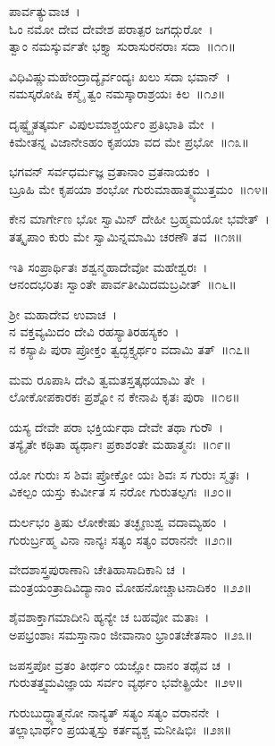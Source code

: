 ಪಾರ್ವತ್ಯುವಾಚ~।\\
ಓಂ ನಮೋ ದೇವ ದೇವೇಶ ಪರಾತ್ಪರ ಜಗದ್ಗುರೋ~।\\
ತ್ವಾಂ ನಮಸ್ಕುರ್ವತೇ ಭಕ್ತ್ಯಾ ಸುರಾಸುರನರಾಃ ಸದಾ~॥೧೧॥

ವಿಧಿವಿಷ್ಣುಮಹೇಂದ್ರಾದ್ಯೈರ್ವಂದ್ಯಃ ಖಲು ಸದಾ ಭವಾನ್~।\\
ನಮಸ್ಕರೋಷಿ ಕಸ್ಮೈ ತ್ವಂ ನಮಸ್ಕಾರಾಶ್ರಯಃ ಕಿಲ~॥೧೨॥

ದೃಷ್ಟ್ವೈತತ್ಕರ್ಮ ವಿಪುಲಮಾಶ್ಚರ್ಯಂ ಪ್ರತಿಭಾತಿ ಮೇ~।\\
ಕಿಮೇತನ್ನ ವಿಜಾನೇಽಹಂ ಕೃಪಯಾ ವದ ಮೇ ಪ್ರಭೋ~॥೧೩॥

ಭಗವನ್ ಸರ್ವಧರ್ಮಜ್ಞ ವ್ರತಾನಾಂ ವ್ರತನಾಯಕಂ~।\\
ಬ್ರೂಹಿ ಮೇ ಕೃಪಯಾ ಶಂಭೋ ಗುರುಮಾಹಾತ್ಮ್ಯಮುತ್ತಮಂ~॥೧೪॥

ಕೇನ ಮಾರ್ಗೇಣ ಭೋ ಸ್ವಾಮಿನ್ ದೇಹೀ ಬ್ರಹ್ಮಮಯೋ ಭವೇತ್~।\\
ತತ್ಕೃಪಾಂ ಕುರು ಮೇ ಸ್ವಾಮಿನ್ನಮಾಮಿ ಚರಣೌ ತವ~॥೧೫॥

ಇತಿ ಸಂಪ್ರಾರ್ಥಿತಃ ಶಶ್ವನ್ಮಹಾದೇವೋ ಮಹೇಶ್ವರಃ~।\\
ಆನಂದಭರಿತಃ ಸ್ವಾಂತೇ ಪಾರ್ವತೀಮಿದಮಬ್ರವೀತ್~॥೧೬॥

ಶ್ರೀ ಮಹಾದೇವ ಉವಾಚ~।\\
ನ ವಕ್ತವ್ಯಮಿದಂ ದೇವಿ ರಹಸ್ಯಾತಿರಹಸ್ಯಕಂ~।\\
ನ ಕಸ್ಯಾಪಿ ಪುರಾ ಪ್ರೋಕ್ತಂ ತ್ವದ್ಭಕ್ತ್ಯರ್ಥಂ ವದಾಮಿ ತತ್~॥೧೭॥

ಮಮ ರೂಪಾಸಿ ದೇವಿ ತ್ವಮತಸ್ತತ್ಕಥಯಾಮಿ ತೇ~।\\
ಲೋಕೋಪಕಾರಕಃ ಪ್ರಶ್ನೋ ನ ಕೇನಾಪಿ ಕೃತಃ ಪುರಾ~॥೧೮॥

ಯಸ್ಯ ದೇವೇ ಪರಾ ಭಕ್ತಿರ್ಯಥಾ ದೇವೇ ತಥಾ ಗುರೌ~।\\
ತಸ್ಯೈತೇ ಕಥಿತಾ ಹ್ಯರ್ಥಾಃ ಪ್ರಕಾಶಂತೇ ಮಹಾತ್ಮನಃ~॥೧೯॥

ಯೋ ಗುರುಃ ಸ ಶಿವಃ ಪ್ರೋಕ್ತೋ ಯಃ ಶಿವಃ ಸ ಗುರುಃ ಸ್ಮೃತಃ~।\\
ವಿಕಲ್ಪಂ ಯಸ್ತು ಕುರ್ವೀತ ಸ ನರೋ ಗುರುತಲ್ಪಗಃ~॥೨೦॥

ದುರ್ಲಭಂ ತ್ರಿಷು ಲೋಕೇಷು ತಚ್ಛೃಣುಶ್ವ ವದಾಮ್ಯಹಂ~।\\
ಗುರುರ್ಬ್ರಹ್ಮ ವಿನಾ ನಾನ್ಯಃ ಸತ್ಯಂ ಸತ್ಯಂ ವರಾನನೇ~॥೨೧॥

ವೇದಶಾಸ್ತ್ರಪುರಾಣಾನಿ ಚೇತಿಹಾಸಾದಿಕಾನಿ ಚ~।\\
ಮಂತ್ರಯಂತ್ರಾದಿವಿದ್ಯಾನಾಂ ಮೋಹನೋಚ್ಚಾಟನಾದಿಕಂ~॥೨೨॥

ಶೈವಶಾಕ್ತಾಗಮಾದೀನಿ ಹ್ಯನ್ಯೇ ಚ ಬಹವೋ ಮತಾಃ~।\\
ಅಪಭ್ರಂಶಾಃ ಸಮಸ್ತಾನಾಂ ಜೀವಾನಾಂ ಭ್ರಾಂತಚೇತಸಾಂ~॥೨೩॥

ಜಪಸ್ತಪೋ ವ್ರತಂ ತೀರ್ಥಂ ಯಜ್ಞೋ ದಾನಂ ತಥೈವ ಚ~।\\
ಗುರುತತ್ತ್ವಮವಿಜ್ಞಾಯ ಸರ್ವಂ ವ್ಯರ್ಥಂ ಭವೇತ್ಪ್ರಿಯೇ~॥೨೪॥

ಗುರುಬುದ್ಧ್ಯಾತ್ಮನೋ ನಾನ್ಯತ್ ಸತ್ಯಂ ಸತ್ಯಂ ವರಾನನೇ~।\\
ತಲ್ಲಾಭಾರ್ಥಂ ಪ್ರಯತ್ನಸ್ತು ಕರ್ತವ್ಯಶ್ಚ ಮನೀಷಿಭಿಃ~॥೨೫॥


